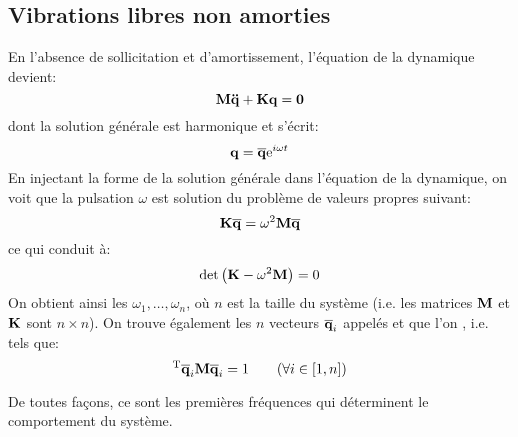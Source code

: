 \subsection{Vibrations libres non amorties}
En l'absence de sollicitation et d'amortissement, l'équation de la dynamique devient:
\begin{equation} \MM{M}\VV{\ddot{q}}+\MM{K}\VV{q}=\VV{0} \end{equation}
dont la solution générale est harmonique et s'écrit:
\begin{equation} \VV{q}=\VV{\overline{q}}\mathrm{e}^{i\omega t} \end{equation}
En injectant la forme de la solution générale dans l'équation de la dynamique, on voit que la
pulsation $\omega$ est solution du problème de valeurs propres suivant:
\begin{equation} \MM{K}\VV{\overline{q}}=\omega^2\MM{M}\VV{\overline{q}} \end{equation}
ce qui conduit à:
\begin{equation} \det\left(\MM{K}-\omega^2\MM{M}\right)=0\end{equation}
\medskipvm
On obtient ainsi les 
$\omega_1,\ldots,\omega_n$, où $n$ est la taille du système (i.e. les matrices $\MM{M}$ et $\MM{K}$ sont $n\times n$).
\medskipvm
On trouve également les $n$ vecteurs $\VV{\overline{q}}_i$ appelés  et que l'on , i.e. tels que:
\begin{equation} \LL{\overline{q}}_i\MM{M}\VV{\overline{q}}_i=1 \qquad  (\forall i\in[1,n]) \end{equation}
\medskipvm
{}

De toutes façons, ce sont les premières fréquences qui déterminent le comportement du système.

\medskip
{}
